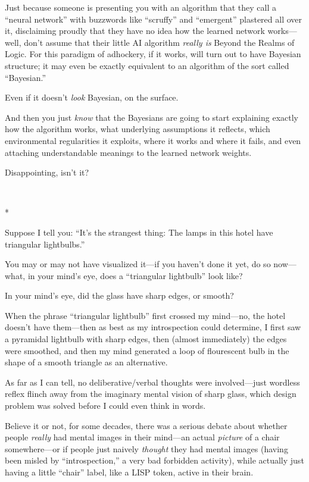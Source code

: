 {
 Just because someone is presenting you with an algorithm that they
call a ``neural network'' with
buzzwords like ``scruffy'' and
``emergent'' plastered all over it,
disclaiming proudly that they have no idea how the learned network
works---well, don't assume that their little AI
algorithm \textit{really is} Beyond the Realms of Logic. For this
paradigm of adhockery, if it works, will turn out to have Bayesian
structure; it may even be exactly equivalent to an algorithm of the
sort called ``Bayesian.''}

{
 Even if it doesn't \textit{look} Bayesian, on the
surface.}

{
 And then you just \textit{know} that the Bayesians are going to
start explaining exactly how the algorithm works, what underlying
assumptions it reflects, which environmental regularities it exploits,
where it works and where it fails, and even attaching understandable
meanings to the learned network weights.}

{
 Disappointing, isn't it?}

{\centering
 \ ~
\par}

{\centering
 *
\par}


{
 Suppose I tell you: ``It's the
strangest thing: The lamps in this hotel have triangular
lightbulbs.''}

{
 You may or may not have visualized it---if you
haven't done it yet, do so now---what, in your
mind's eye, does a ``triangular
lightbulb'' look like?}

{
 In your mind's eye, did the glass have sharp
edges, or smooth?}

{
 When the phrase ``triangular
lightbulb'' first crossed my mind---no, the hotel
doesn't have them---then as best as my introspection
could determine, I first saw a pyramidal lightbulb with sharp edges,
then (almost immediately) the edges were smoothed, and then my mind
generated a loop of flourescent bulb in the shape of a smooth triangle
as an alternative.}

{
 As far as I can tell, no deliberative/verbal thoughts were
involved---just wordless reflex flinch away from the imaginary mental
vision of sharp glass, which design problem was solved before I could
even think in words.}

{
 Believe it or not, for some decades, there was a serious debate
about whether people \textit{really} had mental images in their
mind---an actual \textit{picture} of a chair somewhere---or if people
just naively \textit{thought} they had mental images (having been
misled by ``introspection,'' a very
bad forbidden activity), while actually just having a little
``chair'' label, like a LISP token,
active in their brain.}

